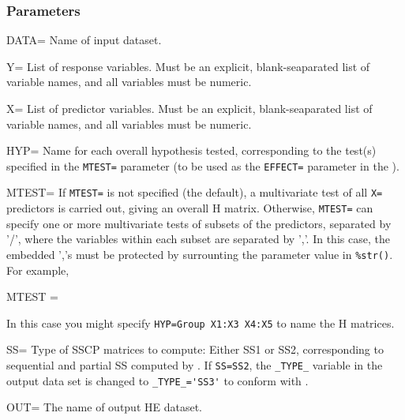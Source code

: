 \subsubsection*{Parameters}
\begin{proglist}

\item[DATA=] Name of input dataset. 

\item[Y=] List of response variables.  Must be an explicit,
blank-seaparated list of variable names, and all variables
must be numeric.

\item[X=] List of predictor variables.  Must be an explicit,
blank-seaparated list of variable names, and all variables
must be numeric.

\item[HYP=] Name for each overall hypothesis tested, corresponding to
the test(s) specified in the \texttt{MTEST=} parameter (to be used as 
the \texttt{EFFECT=} parameter in the ).  

\item[MTEST=] If \texttt{MTEST=} is not specified (the default), a multivariate test
of all \texttt{X=} predictors is carried out, giving an overall H matrix.
Otherwise, \texttt{MTEST=} can specify one or more multivariate tests of
subsets of the predictors, separated by '/', where the variables
within each subset are separated by ','. In this case, the embedded
','s must be protected by surrounting the parameter value in
\texttt{\%str()}.  For example,

\begin{listing}
 MTEST = %
\end{listing}

In this case you might specify \texttt{HYP=Group X1:X3 X4:X5} to name
the H matrices.

\item[SS=] Type of SSCP matrices to compute: Either SS1 or SS2, corresponding
to sequential and partial SS computed by . If \texttt{SS=SS2},
the \verb|_TYPE_| variable in the output data set is changed to
\verb|_TYPE_='SS3'|  to conform with . 

\item[OUT=] The name of output HE dataset. 

\end{proglist}
